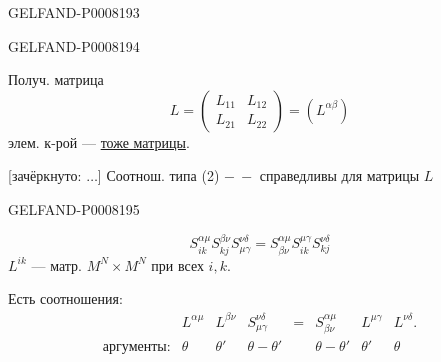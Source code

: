 \begin{GelfandAdjacentEvidence}{GELFAND-P000819}{3}


\end{GelfandAdjacentEvidence}
\begin{GelfandAdjacentEvidence}{GELFAND-P000819}{4}


Получ. матрица
\begin{equation*}
L=\begin{pmatrix}L_{11}&L_{12}\\L_{21}&L_{22}\end{pmatrix}
=(L^{\alpha\beta})\tag{19}
\end{equation*}
элем. к-рой — \uline{тоже матрицы}.

[зачёркнуто: \sout{\(\ldots\)}]
Соотнош. типа (2) \(-\ -\) справедливы для матрицы \(L\)
\end{GelfandAdjacentEvidence}
\begin{GelfandAdjacentEvidence}{GELFAND-P000819}{5}


\begin{equation*}
S_{ik}^{\alpha\mu}S_{kj}^{\beta\nu}S_{\mu\gamma}^{\nu\delta}
=S_{\beta\nu}^{\alpha\mu}S_{ik}^{\mu\gamma}S_{kj}^{\nu\delta}
\tag*{(2)\('\)}
\end{equation*}
\(L^{ik}\) — матр. \(M^N\times M^N\) при всех \(i,k\).

Есть соотношения:
\begin{equation*}
\begin{array}{rccccccc}
 &L^{\alpha\mu}&L^{\beta\nu}&S_{\mu\gamma}^{\nu\delta}
 &=&S_{\beta\nu}^{\alpha\mu}&L^{\mu\gamma}&L^{\nu\delta}.\\
 \text{аргументы:}&\theta&\theta'&\theta-\theta'
 &&\theta-\theta'&\theta'&\theta
\end{array}\tag{20}
\end{equation*}
\end{GelfandAdjacentEvidence}



